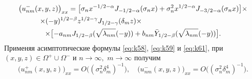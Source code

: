 \begin{multline}
\bigl( u^-_{nm}(x,y,z)\bigr)_{xx} =
\bigl[\sigma_n x^{- 1/2 -\alpha}J_{- 1/2 -\alpha}(\sigma_n x)+\sigma_n^2 x^{ 1/2 -\alpha}J_{-3/2-\alpha}(\sigma_n x)\bigr] \times \\ 
~~~~~~~~~\times  (-y)^{ 1/2 -\beta}z^{ 1/2 -\gamma} 
J_{ 1/2 -\gamma}(\delta_m z) \times\hfill \\ \times \bigl[-a_{nm}J_{ 1/2 -\beta}(\sqrt{\lambda_{nm}}(-y))+b_{nm}\bar Y_{ 1/2 -\beta}(\sqrt{\lambda_{nm}}(-y))\bigr].
\end{multline}
Применяя асимптотические формулы \eqref{eq:k58}, \eqref{eq:k59} и \eqref{eq:k61}, при ${(x,y,z)\in\Omega^+\cup\Omega^-}$ и $n\to\infty, $ $m\to\infty $ получим
$$
\bigl( u^+_{nm}(x,y,z)\bigr)_{xx} =O\bigl(({\sigma_n^2\delta_m^4})^{-1}\bigr),\quad 
\bigl( u^-_{nm}(x,y,z)\bigr)_{xx} =O\bigl(({\sigma_n^2\delta_m^4})^{-1}\bigr).
$$

